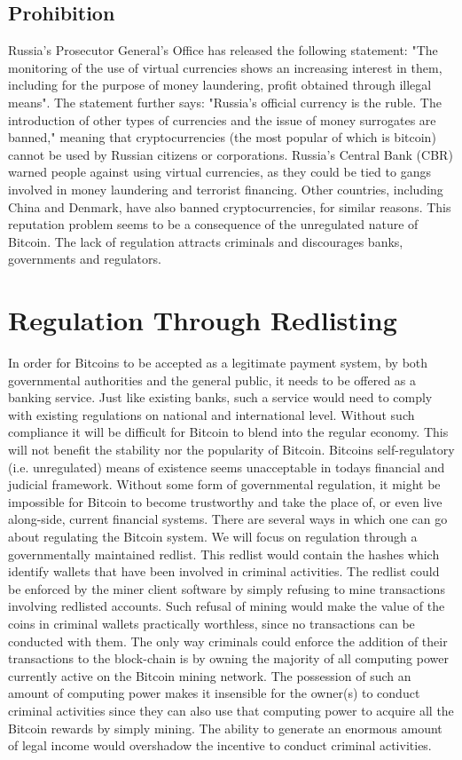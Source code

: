 \documentclass[12pt,journal,compsoc]{IEEEtran}
\begin{document}
\subsection{Prohibition}
Russia's Prosecutor General’s Office has released the following statement: "The monitoring of the use of virtual currencies shows an increasing interest in them, including for the purpose of money laundering, profit obtained through illegal means".
The statement further says: "Russia’s official currency is the ruble. The introduction of other types of currencies and the issue of money surrogates are banned," meaning that cryptocurrencies (the most popular of which is bitcoin) cannot be used by Russian citizens or corporations. Russia’s Central Bank (CBR) warned people against using virtual currencies, as they could be tied to gangs involved in money laundering and terrorist financing.
Other countries, including China and Denmark, have also banned cryptocurrencies, for similar reasons.
This reputation problem seems to be a consequence of the unregulated nature of Bitcoin. The lack of regulation attracts criminals and discourages banks, governments and regulators\cite{marian2013cryptocurrencies}.

\section{Regulation Through Redlisting}
In order for Bitcoins to be accepted as a legitimate payment system, by both governmental authorities and the general public, it needs to be offered as a banking service. Just like existing banks, such a service would need to comply with existing regulations on national and international level. Without such compliance it will be difficult for Bitcoin to blend into the regular economy. This will not benefit the stability nor the popularity of Bitcoin.
Bitcoins self-regulatory (i.e. unregulated) means of existence seems unacceptable in todays financial and judicial framework.
Without some form of governmental regulation, it might be impossible for Bitcoin to become
trustworthy and take the place of, or even live along-side, current financial systems.
There are several ways in which one can go about regulating the Bitcoin system. We will focus on regulation through a governmentally maintained redlist. This redlist would contain the hashes which identify wallets that have been involved in criminal activities. The redlist could be enforced by the miner client software by simply refusing to mine transactions involving redlisted accounts.
Such refusal of mining would make the value of the coins in criminal wallets practically worthless,
since no transactions can be conducted with them. The only way criminals could enforce the addition
of their transactions to the block-chain is by owning the majority of all computing power currently
active on the Bitcoin mining network. The possession of such an amount of computing power makes it
insensible for the owner(s) to conduct criminal activities since they can also use that computing
power to acquire all the Bitcoin rewards by simply mining. The ability to generate an enormous
amount of legal income would overshadow the incentive to conduct criminal activities.
\end{document}
